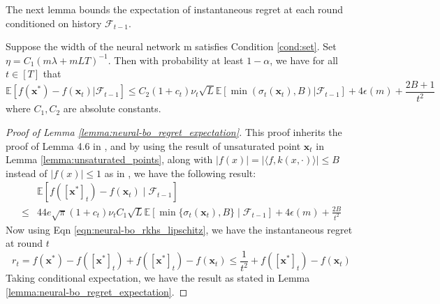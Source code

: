 The next lemma bounds the expectation of instantaneous regret at each round conditioned on history $\mathcal{F}_{t-1}$.

\begin{lemma}
\label{lemma:neural-bo_regret_expectation}
Suppose the width of the neural network m satisfies Condition \ref{cond:set}. Set $\eta = C_1(m\lambda + mLT)^{-1}$. Then with probability at least $1- \alpha$, we have for all $t \in [T]$ that
\begin{equation*}
\mathbb{E}[f(\mathbf{x}^*) - f(\mathbf{x}_t) \lvert \mathcal{F}_{t-1}] \leq C_2 (1+c_t)\nu_t \sqrt{L} \mathbb{E}[ \min(\sigma_t(\mathbf{x}_t),B)\lvert\mathcal{F}_{t-1}] + 4\epsilon(m) + \frac{2B+1}{t^2}
\end{equation*}
where $C_1, C_2$ are absolute constants.
\end{lemma}

\begin{proof} [Proof of Lemma \ref{lemma:neural-bo_regret_expectation}]
     
This proof inherits the proof of Lemma 4.6 in \citet{zhang2021neural}, and by using the result of unsaturated point $\mathbf{x}_t$ in Lemma \ref{lemma:unsaturated_points}, along with $\lvert f(x)  \rvert = \lvert \langle f, k(x,\cdot) \rangle \rvert \leq B$ instead of $\lvert f(x) \rvert  \leq 1$ as in \citet{zhang2021neural}, we have the following result:
\begin{equation*}
\begin{split}
    &  \mathbb{E} [f([\mathbf{x}^*]_t) - f(\mathbf{x}_t) \mid \mathcal{F}_{t-1}] \\
    \leq  & 44e\sqrt{\pi}(1+c_t )\nu_t C_1\sqrt {L} \mathbb{E}[\min \{\sigma_t(\mathbf{x}_t),B\} \mid \mathcal{F}_{t-1}] + 4\epsilon(m) + \frac{2B}{t^2}
\end{split}
\end{equation*}
Now using Eqn \ref{eqn:neural-bo_rkhs_lipschitz}, we have the instantaneous regret at round $t$
\[
r_t = f(\mathbf{x}^*) - f([\mathbf{x}^*]_t) + f([\mathbf{x}^*]_t) - f(\mathbf{x}_t) \leq \frac{1}{t^2} + f([\mathbf{x}^*]_t) - f(\mathbf{x}_t)
\]
Taking conditional expectation, we have the result as stated in Lemma \ref{lemma:neural-bo_regret_expectation}.

\end{proof}

